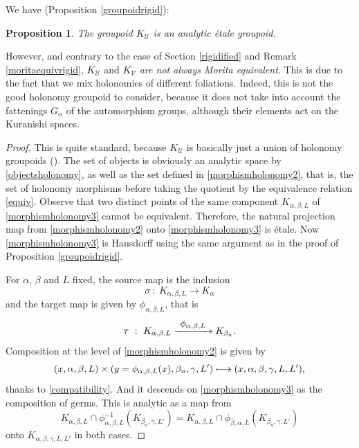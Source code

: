 \documentclass[JEP,XML,SOM,Unicode]{cedram}
\let\mathcal\mathscr
\def\mto{\mathchoice{\longmapsto}{\mapsto}{\mapsto}{\mapsto}}
\def\To#1{\mathchoice{\xrightarrow{\textstyle\kern4pt#1\kern3pt}}{\stackrel{#1}{\longrightarrow}}{}{}}
\theoremstyle{plain}
\newtheorem{proposition}[theorem]{Proposition}
\theoremstyle{definition}
\theoremstyle{remark}
\numberwithin{equation}{section}
\begin{document}
We have (\cf Proposition \ref{groupoidrigid}):
\begin{proposition}
\label{groupoidII}
The groupoid $K_{\mathcal U}$ is an analytic étale groupoid.
\end{proposition}
However, and contrary to the case of Section \ref{rigidified} and Remark \ref{moritaequivrigid}, $K_{\mathcal U}$ and $K_{\mathcal V}$ \emph{are not always Morita equivalent}. This is due to the fact that we mix holonomies of different foliations. Indeed, this is not the good holonomy groupoid to consider, because it does not take into account the fattenings $G_\alpha$ of the automorphism groups, although their elements act on the Kuranishi spaces.
\begin{proof}
This is quite standard, because $K_{\mathcal U}$ is basically just a union of holonomy groupoids (\cf \cite{Ha}).
The set of objects is obviously an analytic space by \eqref{objectsholonomy}, as well as the set defined in \eqref{morphismholonomy2}, that is, the set of holonomy morphisms before taking the quotient by the equivalence relation \eqref{equiv}. Observe that two distinct points of the same component $K_{\alpha,\beta, L}$ of \eqref{morphismholonomy3} cannot be equivalent. Therefore, the natural projection
map from \eqref{morphismholonomy2} onto \eqref{morphismholonomy3} is étale. Now \eqref{morphismholonomy3} is Hausdorff using the same argument as in the proof of Proposition \ref{groupoidrigid}.

For $\alpha$, $\beta$ and $L$ fixed, the source map is the inclusion
\begin{equation}
\label{sourceholonomy}
\sigma\ :\ K_{\alpha,\beta,L}\longrightarrow K_{\alpha}
\end{equation}
and the target map is given by $\phi_{\alpha,\beta, L}$, that is
\begin{equation}
\label{targetholonomy}
\tau \ :\ K_{\alpha,\beta, L}\To{\phi_{\alpha,\beta, L}}K_{\beta_n}.
\end{equation}
Composition at the level of \eqref{morphismholonomy2} is given by
\begin{equation}
\label{compholonomy}
(x,\alpha,\beta, L)\times (y=\phi_{\alpha,\beta,L}(x), \beta_n,\gamma, L')\mto (x, \alpha,\beta,\gamma, L, L'),
\end{equation}
thanks to \eqref{compatibility}. And it descends on \eqref{morphismholonomy3} as the composition of germs. This is analytic as a map from
\begin{equation}
\label{companaholonomy}
K_{\alpha,\beta,L}\cap \phi_{\alpha,\beta, L}^{-1} (K_{\beta_n, \gamma, L'})=K_{\alpha,\beta,L}\cap \phi_{\bar\beta, \alpha, \bar L} (K_{\beta_n, \gamma, L'})
\end{equation}
onto $K_{\alpha,\beta,\gamma, L, L'}$ in both cases.
\end{proof}
\end{document}
